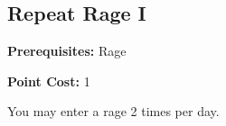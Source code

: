 \subsection*{Repeat Rage I}\label{feat:repeatrage1}

\noindent
\textbf{Prerequisites:} Rage

\noindent
\textbf{Point Cost:} 1 

You may enter a rage 2 times per day.
